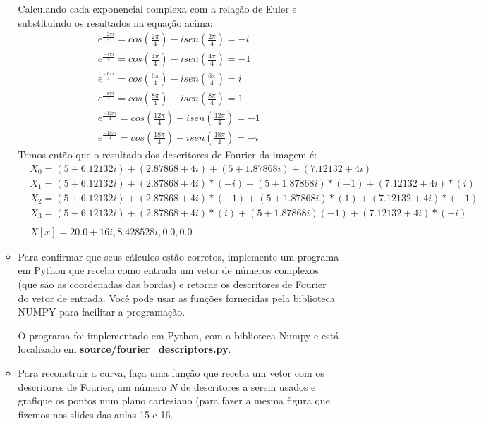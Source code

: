 \documentclass[12pt]{article}
\begin{document}
\begin{itemize}
\begin{itemize}
Calculando cada exponencial complexa com a relação de Euler e substituindo os resultados na equação acima:
\begin{align*}
    &e^{\frac{-2\pi i}{4}} = cos(\frac{2\pi}{4}) - isen(\frac{2\pi}{4}) = -i &\\
    &e^{\frac{-4\pi i}{4}} = cos(\frac{4\pi}{4}) - isen(\frac{4\pi}{4}) = -1 &\\
    &e^{\frac{-6\pi i}{4}} = cos(\frac{6\pi}{4}) - isen(\frac{6\pi}{4}) = i &\\
    &e^{\frac{-8\pi i}{4}} = cos(\frac{8\pi}{4}) - isen(\frac{8\pi}{4}) = 1 &\\
    &e^{\frac{-12\pi i}{4}} = cos(\frac{12\pi}{4}) - isen(\frac{12\pi}{4}) = -1 &\\
    &e^{\frac{-18\pi i}{4}} = cos(\frac{18\pi}{4}) - isen(\frac{18\pi}{4}) = -i &
\end{align*}
Temos então que o resultado dos descritores de Fourier da imagem é:
\begin{align*}
    &X_0 = (5 + 6.12132i) + (2.87868 + 4i) + (5 + 1.87868i) + (7.12132 + 4i) &\\
    &X_1 = (5 + 6.12132i) + (2.87868 + 4i)*(-i) + (5 + 1.87868i)*(-1) + (7.12132 + 4i)*(i) &\\
    &X_2 = (5 + 6.12132i) + (2.87868 + 4i)*(-1) + (5 + 1.87868i)*(1) + (7.12132 + 4i)*(-1) &\\
    &X_3 = (5 + 6.12132i) + (2.87868 + 4i)*(i) + (5 + 1.87868i)(-1) + (7.12132 + 4i)*(-i) &\\
    \\
    &X[x] = 20.0 + 16i,  8.428528i, 0.0, 0.0&
\end{align*}
     
\item Para confirmar que seus cálculos estão corretos, implemente um
  programa em Python que receba como entrada um vetor de números
  complexos (que são as coordenadas das bordas) e retorne os
  descritores de Fourier do vetor de entrada. Você pode usar as
  funções fornecidas pela biblioteca NUMPY para facilitar a
  programação.
  
O programa foi implementado em Python, com a biblioteca Numpy e está localizado em \textbf{source/fourier\_descriptors.py}.

\item Para reconstruir a curva, faça uma função que receba um vetor
  com os descritores de Fourier, um número $N$ de descritores a serem
  usados e grafique os pontos num plano cartesiano (para fazer a mesma 
figura que fizemos nos slides das aulas 15 e 16.


\end{itemize}
\end{itemize}
\end{document}
